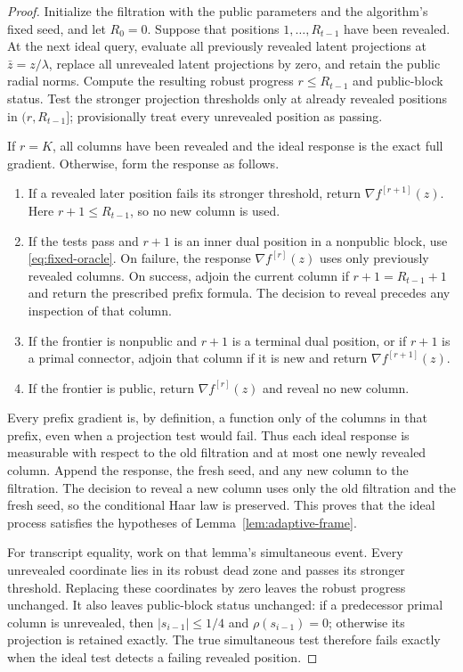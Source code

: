 \documentclass[11pt,a4paper]{article}
\theoremstyle{definition}
\theoremstyle{remark}
\numberwithin{equation}{section}
\begin{document}
\begin{proof}
Initialize the filtration with the public parameters and the algorithm's
fixed seed, and let $R_0=0$.  Suppose that positions
$1,\ldots,R_{t-1}$ have been revealed.  At the next ideal query, evaluate
all previously revealed latent projections at $\bar z=z/\lambda$,
replace all unrevealed latent projections by zero, and retain the public
radial norms.  Compute the resulting robust progress $r\le R_{t-1}$ and
public-block status.  Test the stronger projection thresholds only at
already revealed positions in $(r,R_{t-1}]$; provisionally treat every
unrevealed position as passing.

If $r=K$, all columns have been revealed and the ideal response is the
exact full gradient.  Otherwise, form the response as follows.
\begin{enumerate}
\item If a revealed later position fails its stronger threshold, return
$\nabla f^{[r+1]}(z)$.  Here $r+1\le R_{t-1}$, so no new column is used.
\item If the tests pass and $r+1$ is an inner dual position in a
nonpublic block, use \eqref{eq:fixed-oracle}.  On failure, the response
$\nabla f^{[r]}(z)$ uses only previously revealed columns.  On success,
adjoin the current column if $r+1=R_{t-1}+1$ and return the prescribed
prefix formula.  The decision to reveal precedes any inspection of
that column.
\item If the frontier is nonpublic and $r+1$ is a terminal dual
position, or if $r+1$ is a primal connector, adjoin
that column if it is new and return $\nabla f^{[r+1]}(z)$.
\item If the frontier is public, return $\nabla f^{[r]}(z)$ and reveal
no new column.
\end{enumerate}
Every prefix gradient is, by definition, a function only of the columns
in that prefix, even when a projection test would fail.  Thus each ideal
response is measurable with respect to the old filtration and at most
one newly revealed column.  Append the response, the fresh seed, and any
new column to the filtration.  The decision to reveal a new column uses
only the old filtration and the fresh seed, so the conditional Haar law
is preserved.  This proves that the ideal process satisfies the
hypotheses of Lemma~\ref{lem:adaptive-frame}.

For transcript equality, work on that lemma's simultaneous event.
Every unrevealed coordinate lies in its robust dead zone and passes its
stronger threshold.  Replacing these coordinates by zero leaves the
robust progress unchanged.  It also leaves public-block status
unchanged: if a predecessor primal column is unrevealed, then
$|s_{i-1}|\le1/4$ and $\rho(s_{i-1})=0$; otherwise its projection is
retained exactly.  The true simultaneous test therefore fails exactly
when the ideal test detects a failing revealed position.


\end{proof}
\end{document}
